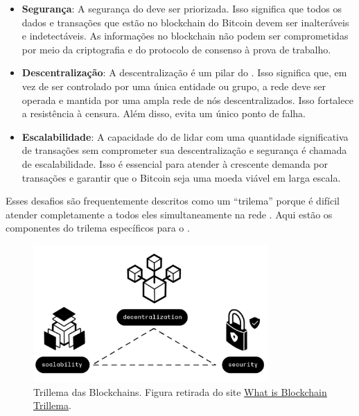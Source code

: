 \documentclass[a4paper,12pt]{article}
\begin{document}
\begin{itemize}
    \item \textbf{Segurança}: A segurança do \btcspace deve ser priorizada. Isso significa que todos os 
    dados e transações que estão no blockchain do Bitcoin devem ser inalteráveis e indetectáveis. 
    As informações no blockchain não podem ser comprometidas por meio da criptografia e do protocolo 
    de consenso à prova de trabalho.

    \item \textbf{Descentralização}: A descentralização é um pilar do \btc. Isso significa que, 
    em vez de ser controlado por uma única entidade ou grupo, a rede deve ser operada e mantida 
    por uma ampla rede de nós descentralizados. Isso fortalece a resistência à censura. Além disso, 
    evita um único ponto de falha.

    \item \textbf{Escalabilidade}: A capacidade do \btcspace de lidar com uma quantidade significativa 
    de transações sem comprometer sua descentralização e segurança é chamada de escalabilidade. Isso é 
    essencial para atender à crescente demanda por transações e garantir que o Bitcoin seja uma moeda 
    viável em larga escala.

\end{itemize}

Esses desafios são frequentemente descritos como um ``trilema'' porque é difícil atender 
completamente a todos eles simultaneamente na rede \btc. Aqui estão os componentes do 
trilema específicos para o \btc.

\begin{figure}[!h]
    \centering
    \includegraphics[width=0.8\textwidth]{images/trillemabtc.png}
    \caption{Trillema das Blockchains. Figura retirada do site \href{https://coinloan.io/blog/what-is-blockchain-trilemma/}{What is Blockchain Trillema}.}
    \label{trillemablockchain}
\end{figure}
\end{document}
